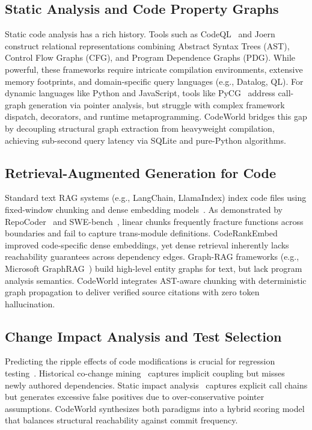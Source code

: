\documentclass[conference]{IEEEtran}
\begin{document}
\subsection{Static Analysis and Code Property Graphs}
Static code analysis has a rich history. Tools such as CodeQL~\cite{codeql} and Joern~\cite{joern} construct relational representations combining Abstract Syntax Trees (AST), Control Flow Graphs (CFG), and Program Dependence Graphs (PDG). While powerful, these frameworks require intricate compilation environments, extensive memory footprints, and domain-specific query languages (e.g., Datalog, QL). For dynamic languages like Python and JavaScript, tools like PyCG~\cite{pycg} address call-graph generation via pointer analysis, but struggle with complex framework dispatch, decorators, and runtime metaprogramming. CodeWorld bridges this gap by decoupling structural graph extraction from heavyweight compilation, achieving sub-second query latency via SQLite and pure-Python algorithms.

\subsection{Retrieval-Augmented Generation for Code}
Standard text RAG systems (e.g., LangChain, LlamaIndex) index code files using fixed-window chunking and dense embedding models~\cite{karpukhin2020dense}. As demonstrated by RepoCoder~\cite{zhang2023repocoder} and SWE-bench~\cite{jimenez2024swebench}, linear chunks frequently fracture functions across boundaries and fail to capture trans-module definitions. CodeRankEmbed~\cite{nomic2024coderankembed} improved code-specific dense embeddings, yet dense retrieval inherently lacks reachability guarantees across dependency edges. Graph-RAG frameworks (e.g., Microsoft GraphRAG~\cite{edge2024graphrag}) build high-level entity graphs for text, but lack program analysis semantics. CodeWorld integrates AST-aware chunking with deterministic graph propagation to deliver verified source citations with zero token hallucination.

\subsection{Change Impact Analysis and Test Selection}
Predicting the ripple effects of code modifications is crucial for regression testing~\cite{lehnert2011review}. Historical co-change mining~\cite{zimmermann2005mining} captures implicit coupling but misses newly authored dependencies. Static impact analysis~\cite{arnold1996software} captures explicit call chains but generates excessive false positives due to over-conservative pointer assumptions. CodeWorld synthesizes both paradigms into a hybrid scoring model that balances structural reachability against commit frequency.
\end{document}
